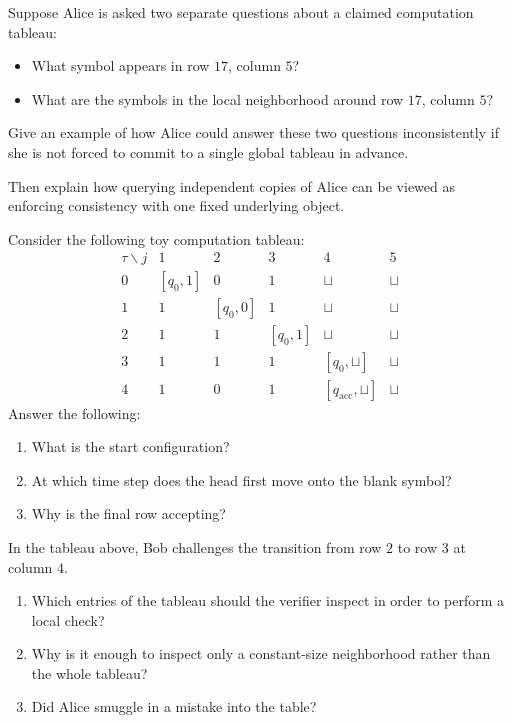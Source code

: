 \documentclass[11pt]{article}
\begin{document}
\begin{exercise}
\label{ex:why-copies-matter}
Suppose Alice is asked two separate questions about a claimed computation tableau:
\begin{itemize}
    \item What symbol appears in row \(17\), column \(5\)?
    \item What are the symbols in the local neighborhood around row \(17\), column \(5\)?
\end{itemize}
Give an example of how Alice could answer these two questions inconsistently if she is not forced to commit to a single global tableau in advance.

Then explain how querying independent copies of Alice can be viewed as enforcing consistency with one fixed underlying object.
\end{exercise}

\begin{exercise}
\label{ex:reading-a-tableau}
Consider the following toy computation tableau:
\[
\begin{array}{c|ccccc}
\tau \backslash j & 1 & 2 & 3 & 4 & 5 \\
\hline
0 & [q_0,1] & 0 & 1 & \sqcup & \sqcup \\
1 & 1 & [q_0,0] & 1 & \sqcup & \sqcup \\
2 & 1 & 1 & [q_0,1] & \sqcup & \sqcup \\
3 & 1 & 1 & 1 & [q_0,\sqcup] & \sqcup \\
4 & 1 & 0 & 1 & [q_{\mathrm{acc}},\sqcup] & \sqcup
\end{array}
\]
Answer the following:
\begin{enumerate}
    \item What is the start configuration?
    \item At which time step does the head first move onto the blank symbol?
    \item Why is the final row accepting?
\end{enumerate}
\end{exercise}

\begin{exercise}
\label{ex:local-checks}
In the tableau above, Bob challenges the transition from row \(2\) to row \(3\) at column \(4\).

\begin{enumerate}
    \item Which entries of the tableau should the verifier inspect in order to perform a local check?
    \item Why is it enough to inspect only a constant-size neighborhood rather than the whole tableau?
    \item Did Alice smuggle in a mistake into the table?
\end{enumerate}
\end{exercise}
\end{document}

